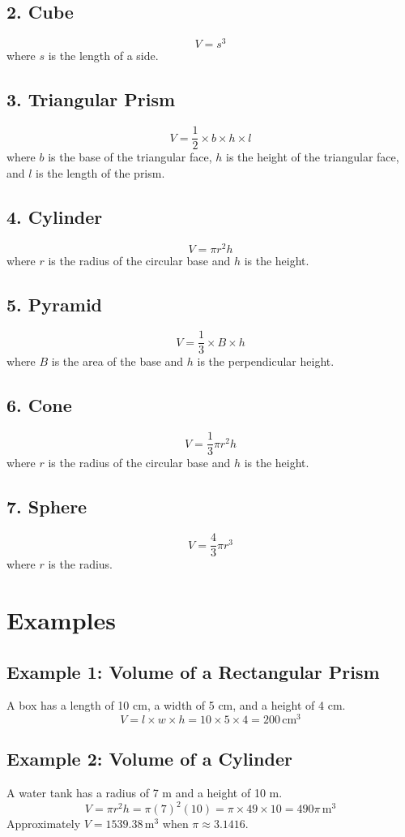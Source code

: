 \documentclass[12pt,a4paper]{article}
\begin{document}
\subsection*{2. Cube}
\[
V = s^3
\]
where \(s\) is the length of a side.

\subsection*{3. Triangular Prism}
\[
V = \frac{1}{2} \times b \times h \times l
\]
where \(b\) is the base of the triangular face, \(h\) is the height of the triangular face, and \(l\) is the length of the prism.

\subsection*{4. Cylinder}
\[
V = \pi r^2 h
\]
where \(r\) is the radius of the circular base and \(h\) is the height.

\subsection*{5. Pyramid}
\[
V = \frac{1}{3} \times B \times h
\]
where \(B\) is the area of the base and \(h\) is the perpendicular height.

\subsection*{6. Cone}
\[
V = \frac{1}{3} \pi r^2 h
\]
where \(r\) is the radius of the circular base and \(h\) is the height.

\subsection*{7. Sphere}
\[
V = \frac{4}{3} \pi r^3
\]
where \(r\) is the radius.

\section*{Examples}

\subsection*{Example 1: Volume of a Rectangular Prism}
A box has a length of 10 cm, a width of 5 cm, and a height of 4 cm.  
\[
V = l \times w \times h = 10 \times 5 \times 4 = 200 \, \text{cm}^3
\]

\subsection*{Example 2: Volume of a Cylinder}
A water tank has a radius of 7 m and a height of 10 m.  
\[
V = \pi r^2 h = \pi (7)^2 (10) = \pi \times 49 \times 10 = 490 \pi \, \text{m}^3
\]  
Approximately \( V = 1539.38 \, \text{m}^3 \) when \(\pi \approx 3.1416\).
\end{document}
